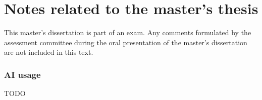 \chapter*{Notes related to the master's thesis}

This master's dissertation is part of an exam. Any comments formulated by the assessment committee during the oral presentation of the master's dissertation are not included in this text.

\subsection*{AI usage}

TODO